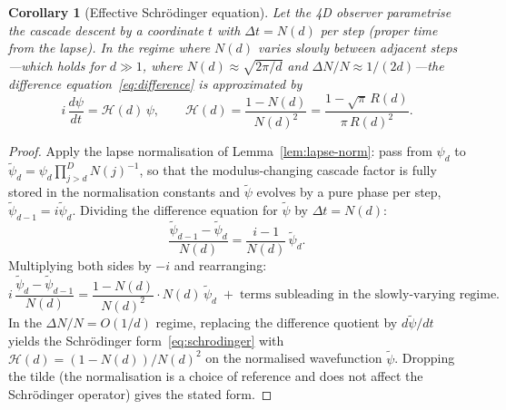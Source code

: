 \documentclass[12pt,a4paper]{article}
\newtheorem{corollary}[theorem]{Corollary}
\begin{document}
\begin{corollary}[Effective Schr\"{o}dinger equation]\label{cor:schrodinger}
Let the 4D observer parametrise the cascade descent by a coordinate $t$ with
$\Delta t = N(d)$ per step (proper time from the lapse). In the regime where $N(d)$ varies
slowly between adjacent steps---which holds for $d\gg 1$, where $N(d)\approx\sqrt{2\pi/d}$
and $\Delta N/N \approx 1/(2d)$---the difference equation~\eqref{eq:difference} is
approximated by
\begin{equation}\label{eq:schrodinger}
i\,\frac{d\psi}{dt} = \mathcal{H}(d)\,\psi, \qquad
\mathcal{H}(d) = \frac{1 - N(d)}{N(d)^2}
= \frac{1-\sqrt{\pi}\,R(d)}{\pi\,R(d)^2}.
\end{equation}
\end{corollary}
\begin{proof}
Apply the lapse normalisation of Lemma~\ref{lem:lapse-norm}: pass from
$\psi_d$ to $\tilde\psi_d = \psi_d\prod_{j>d}^D N(j)^{-1}$, so that the
modulus-changing cascade factor is fully stored in the normalisation
constants and $\tilde\psi$ evolves by a pure phase per step,
$\tilde\psi_{d-1} = i\tilde\psi_d$. Dividing the difference equation for
$\tilde\psi$ by $\Delta t = N(d)$:
\[
\frac{\tilde\psi_{d-1} - \tilde\psi_d}{N(d)}
= \frac{i - 1}{N(d)}\,\tilde\psi_d.
\]
Multiplying both sides by $-i$ and rearranging:
\[
i\,\frac{\tilde\psi_d - \tilde\psi_{d-1}}{N(d)}
= \frac{1 - N(d)}{N(d)^2}\cdot N(d)\,\tilde\psi_d
\;+\; \text{terms subleading in the slowly-varying regime.}
\]
In the $\Delta N/N = O(1/d)$ regime, replacing the difference quotient
by $d\tilde\psi/dt$ yields the Schr\"{o}dinger
form~\eqref{eq:schrodinger} with
$\mathcal{H}(d) = (1-N(d))/N(d)^2$ on the normalised wavefunction
$\tilde\psi$. Dropping the tilde (the normalisation is a choice of
reference and does not affect the Schr\"{o}dinger operator) gives the
stated form.
\end{proof}
\end{document}
